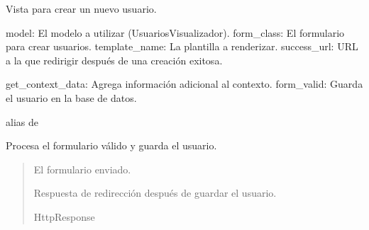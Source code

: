\documentclass[letterpaper,10pt,spanish]{sphinxmanual}
\begin{document}
\begin{fulllineitems}

\pysigstartsignatures
{}
\pysigstopsignatures
\sphinxAtStartPar
Vista para crear un nuevo usuario.
\begin{description}
\sphinxAtStartPar
model: El modelo a utilizar (UsuariosVisualizador).
form\_class: El formulario para crear usuarios.
template\_name: La plantilla a renderizar.
success\_url: URL a la que redirigir después de una creación exitosa.

\sphinxAtStartPar
get\_context\_data: Agrega información adicional al contexto.
form\_valid: Guarda el usuario en la base de datos.

\end{description}


\begin{fulllineitems}

\pysigstartsignatures
{}
\pysigstopsignatures
\sphinxAtStartPar
alias de 

\end{fulllineitems}



\begin{fulllineitems}

\pysigstartsignatures
{}
\pysigstopsignatures
\sphinxAtStartPar
Procesa el formulario válido y guarda el usuario.
\begin{quote}\begin{description}
\sphinxAtStartPar
{} \textendash{} El formulario enviado.

\sphinxAtStartPar
Respuesta de redirección después de guardar el usuario.

\sphinxAtStartPar
HttpResponse

\end{description}\end{quote}

\end{fulllineitems}




\end{fulllineitems}
\end{document}
